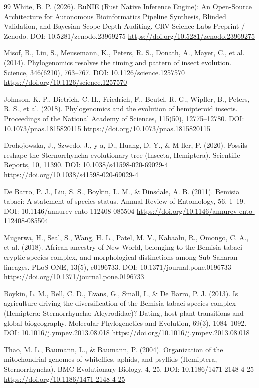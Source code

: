 \documentclass[10pt,letterpaper]{article}
\begin{document}
\begin{thebibliography}{99}
 White, B. P. (2026). RuNIE (Rust Native Inference Engine): An Open-Source Architecture for Autonomous Bioinformatics Pipeline Synthesis, Blinded Validation, and Bayesian Scope-Depth Auditing. CRV Science Labs Preprint / Zenodo. DOI: 10.5281/zenodo.23969275 \url{https://doi.org/10.5281/zenodo.23969275}

 Misof, B., Liu, S., Meusemann, K., Peters, R. S., Donath, A., Mayer, C., et al. (2014). Phylogenomics resolves the timing and pattern of insect evolution. Science, 346(6210), 763--767. DOI: 10.1126/science.1257570 \url{https://doi.org/10.1126/science.1257570}

 Johnson, K. P., Dietrich, C. H., Friedrich, F., Beutel, R. G., Wipfler, B., Peters, R. S., et al. (2018). Phylogenomics and the evolution of hemipteroid insects. Proceedings of the National Academy of Sciences, 115(50), 12775--12780. DOI: 10.1073/pnas.1815820115 \url{https://doi.org/10.1073/pnas.1815820115}

 Drohojowska, J., Szwedo, J.,  y a, D., Huang, D. Y., \& M ller, P. (2020). Fossils reshape the Sternorrhyncha evolutionary tree (Insecta, Hemiptera). Scientific Reports, 10, 11390. DOI: 10.1038/s41598-020-69029-4 \url{https://doi.org/10.1038/s41598-020-69029-4}

 De Barro, P. J., Liu, S. S., Boykin, L. M., \& Dinsdale, A. B. (2011). Bemisia tabaci: A statement of species status. Annual Review of Entomology, 56, 1--19. DOI: 10.1146/annurev-ento-112408-085504 \url{https://doi.org/10.1146/annurev-ento-112408-085504}

 Mugerwa, H., Seal, S., Wang, H. L., Patel, M. V., Kabaalu, R., Omongo, C. A., et al. (2018). African ancestry of New World, belonging to the Bemisia tabaci cryptic species complex, and morphological distinctions among Sub-Saharan lineages. PLoS ONE, 13(5), e0196733. DOI: 10.1371/journal.pone.0196733 \url{https://doi.org/10.1371/journal.pone.0196733}

 Boykin, L. M., Bell, C. D., Evans, G., Small, I., \& De Barro, P. J. (2013). Is agriculture driving the diversification of the Bemisia tabaci species complex (Hemiptera: Sternorrhyncha: Aleyrodidae)? Dating, host-plant transitions and global biogeography. Molecular Phylogenetics and Evolution, 69(3), 1084--1092. DOI: 10.1016/j.ympev.2013.08.018 \url{https://doi.org/10.1016/j.ympev.2013.08.018}

 Thao, M. L., Baumann, L., \& Baumann, P. (2004). Organization of the mitochondrial genomes of whiteflies, aphids, and psyllids (Hemiptera, Sternorrhyncha). BMC Evolutionary Biology, 4, 25. DOI: 10.1186/1471-2148-4-25 \url{https://doi.org/10.1186/1471-2148-4-25}


\end{thebibliography}
\end{document}
